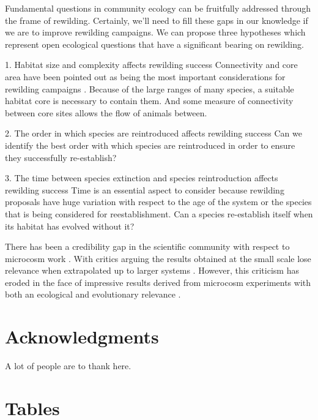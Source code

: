 \documentclass[a4paper,12pt]{article}
\begin{document}
Fundamental questions in community ecology can be fruitfully addressed through the frame of rewilding. 
Certainly, we’ll need to fill these gaps in our knowledge if we are to improve rewilding campaigns. 
We can propose three hypotheses which represent open ecological questions that have a significant bearing on rewilding. 

1.	Habitat size and complexity affects rewilding success
Connectivity and core area have been pointed out as being the most important considerations for rewilding campaigns \citep{soule1998rewilding}. 
Because of the large ranges of many species, a suitable habitat core is necessary to contain them. And some measure of connectivity between core sites allows the flow of animals between. 

2. The order in which species are reintroduced affects rewilding success 
Can we identify the best order with which species are reintroduced in order to ensure they successfully re-establish? 

3. The time between species extinction and species reintroduction affects rewilding success 
Time is an essential aspect to consider because rewilding proposals have huge variation with respect to the age of the system or the species that is being considered for reestablishment. 
Can a species re-establish itself when its habitat has evolved without it?

There has been a credibility gap in the scientific community with respect to microcosm work \citep{benton2007microcosm}. 
With critics arguing the results obtained at the small scale lose relevance when extrapolated up to larger systems \citep{carpenter1996microcosm}. 
However, this criticism has eroded in the face of impressive results derived from microcosm experiments with both an ecological and evolutionary relevance \citep{jessup2004big,benton2007microcosm,buckling2009beagle,mcclean2015single}.  


\section*{Acknowledgments}

A lot of people are to thank here.


\newpage





\newpage


\section*{Tables}
\end{document}
